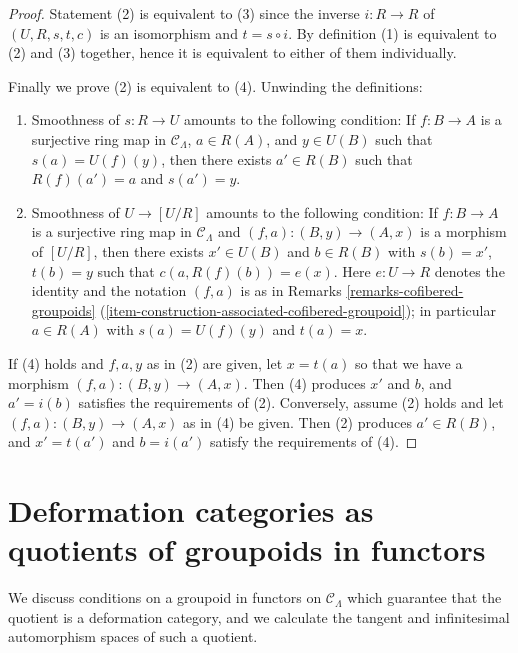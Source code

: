 \begin{proof}
Statement (2) is equivalent to (3) since the inverse $i: R \to R$ of
$(U, R, s, t, c)$ is an isomorphism and $t = s \circ i$. By definition (1) is
equivalent to (2) and (3) together, hence it is equivalent to either of them
individually.

\medskip\noindent
Finally we prove (2) is equivalent to (4). Unwinding the definitions:
\begin{enumerate}
\item[(2)] Smoothness of $s: R \to U$ amounts to the following
condition: If $f: B \to A$ is a surjective ring map in
$\mathcal{C}_\Lambda$, $a \in R(A)$, and $y \in U(B)$ such that
$s(a) = U(f)(y)$, then there exists $a' \in R(B)$ such that
$R(f)(a') = a$ and $s(a') = y$.
\item[(4)] Smoothness of $U \to [U/R]$ amounts to the following
condition: If $f: B \to A$ is a surjective ring map in
$\mathcal{C}_\Lambda$ and $(f, a) : (B, y) \to (A, x)$
is a morphism of $[U/R]$, then there exists $x' \in U(B)$ and
$b \in R(B)$ with $s(b) = x'$, $t(b) = y$
such that $c(a, R(f)(b)) = e(x)$.  Here $e : U \to R$ denotes the
identity and the notation $(f, a)$ is as in Remarks
\ref{remarks-cofibered-groupoids}
(\ref{item-construction-associated-cofibered-groupoid});
in particular $a \in R(A)$ with $s(a) = U(f)(y)$ and $t(a) = x$.
\end{enumerate}
If (4) holds and $f, a, y$ as in (2) are given, let $x = t(a)$ so that
we have a morphism $(f, a): (B, y) \to (A, x)$.
Then (4) produces $x'$ and $b$, and $a' = i(b)$ satisfies the requirements
of (2). Conversely, assume (2) holds and let $(f, a): (B, y) \to (A, x)$
as in (4) be given. Then (2) produces $a' \in R(B)$, and $x' = t(a')$ and
$b = i(a')$ satisfy the requirements of (4).
\end{proof}





\section{Deformation categories as quotients of groupoids in functors}
\label{section-deformation-categories-as-quotients}

\noindent
We discuss conditions on a groupoid in functors on $\mathcal{C}_\Lambda$ which
guarantee that the quotient is a deformation category, and we calculate the
tangent and infinitesimal automorphism spaces of such a quotient.

